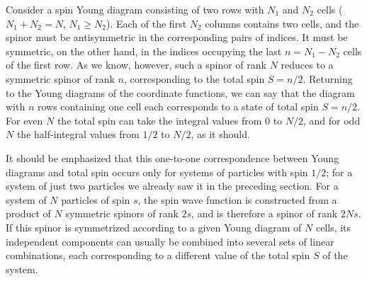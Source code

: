\begin{figure}[ht]
\centering
{}
\par{}
\end{figure}

Consider a spin Young diagram consisting of two rows with $N_1$ and $N_2$ cells ($N_1+N_2=N$, $N_1\geq N_2$). Each of the first $N_2$ columns contains two cells, and the spinor must be antisymmetric in the corresponding pairs of indices. It must be symmetric, on the other hand, in the indices occupying the last $n=N_1-N_2$ cells of the first row. As we know, however, such a spinor of rank $N$ reduces to a symmetric spinor of rank $n$, corresponding to the total spin $S=n/2$. Returning to the Young diagrams of the coordinate functions, we can say that the diagram with $n$ rows containing one cell each corresponds to a state of total spin $S=n/2$. For even $N$ the total spin can take the integral values from 0 to $N/2$, and for odd $N$ the half-integral values from $1/2$ to $N/2$, as it should.

It should be emphasized that this one-to-one correspondence between Young diagrams and total spin occurs only for systems of particles with spin $1/2$; for a system of just two particles we already saw it in the preceding section. For a system of $N$ particles of spin $s$, the spin wave function is constructed from a product of $N$ symmetric spinors of rank $2s$, and is therefore a spinor of rank $2Ns$. If this spinor is symmetrized according to a given Young diagram of $N$ cells, its independent components can usually be combined into several sets of linear combinations, each corresponding to a different value of the total spin $S$ of the system.

